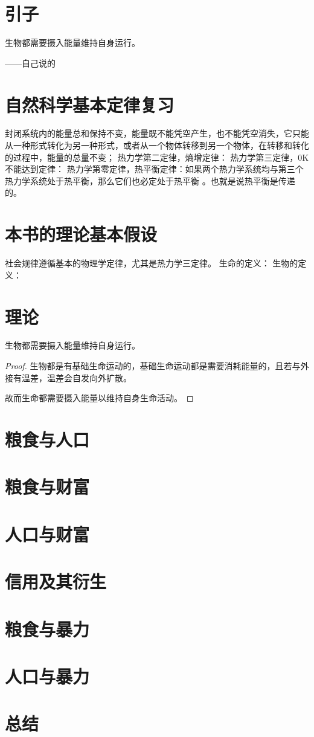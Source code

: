 \section{引子}
生物都需要摄入能量维持自身运行。

\hfill ------自己说的 

\section{自然科学基本定律复习}
封闭系统内的能量总和保持不变，能量既不能凭空产生，也不能凭空消失，它只能从一种形式转化为另一种形式，或者从一个物体转移到另一个物体，在转移和转化的过程中，能量的总量不变；
\theorem 热力学第二定律，熵增定律：
\theorem 热力学第三定律，0K不能达到定律：
\theorem 热力学第零定律，热平衡定律：如果两个热力学系统均与第三个热力学系统处于热平衡，那么它们也必定处于热平衡 。也就是说热平衡是传递的。


\section{本书的理论基本假设}
\assume  社会规律遵循基本的物理学定律，尤其是热力学三定律。
\assume 生命的定义：
\assume 生物的定义：


\section{理论}
\theorem 生物都需要摄入能量维持自身运行。
\begin{proof}
    生物都是有基础生命运动的，基础生命运动都是需要消耗能量的，且若与外接有温差，温差会自发向外扩散。

    故而生命都需要摄入能量以维持自身生命活动。
\end{proof}
\newpage

\section{粮食与人口}
\section{粮食与财富}
\section{人口与财富}
\section{信用及其衍生}
\section{粮食与暴力}
\section{人口与暴力}
\section{总结}

